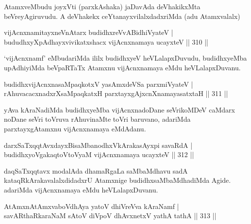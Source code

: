 \begin{artha}
AtamxveMbudu joyxVti (parxkAshaka) jaDavAda deVhakikxMta beVreyAgiruvudu. A deVhakekx ceYtanayxvilalxdadxriMda (adu Atamxvalalx)
\end{artha}


\begin{shl}
vijAcnxnamitayxneVnAtarx budidhxreVvABidhiVyateV | \\
bududhxyXpAdhayxvivikatxshacx vijAcnxnamaya ucayxteV \hfill||  310 || 
\end{shl}	

\begin{artha}
`vijAcnxnamf' eMbudariMda ililx budidhxyeV heVLalapxDuvudu, budidhxyeMba upAdhiyiMda beVpaRTaTx Atamxnu vijAcnxnamaya eMdu heVLalapxDuvanu.
\end{artha}


\begin{shl}
budidhxvijAcnxnasaMpaqkotxV yasAmxdeVSa parxmiVyateV | \\
rAhuvacacxnadxrXsaMpaqkatxH parxtayxgAjxcnXnamayasatxtaH \hfill||  311 ||  
\end{shl}

\begin{artha}
yAva kAraNadiMda budidhxyeMba vijAcnxnadoDane seVrikoMDeV caMdarx noDane seVri toVruva rAhuvinaMte toVri baruvano, adariMda parxtayxgAtamxnu vijAcnxnamaya eMdAdanu.
\end{artha}

\begin{shl}
darxSaTxqqtAvxdayxBisaMbanodhxV\s kArakasAyxpi savaRdA | \\
budidhxyoVgakaqtoV\s toV\s yaM vijAcnxnamaya ucayxteV \hfill ||  312 ||  
\end{shl}

\begin{artha}
daqSaTxqqtavx modalAda dhamaRgaLa saMbaMdhavu sadA kataqRkArakavalalxdidadxrU Atamxnige budidhxsaMbaMdhadiMda Agide. adariMda vijAcnxnamaya eMdu heVLalapxDuvanu.
\end{artha}


\begin{shl}
AtAmxnAtAmxvaboVdhAya yatoV dhiVreVva kAraNamf | \\
savARthaRkaraNaM sA\s toV diVpoV dhAvxnetxV yathA tathA \hfill||  313 ||  
\end{shl}

